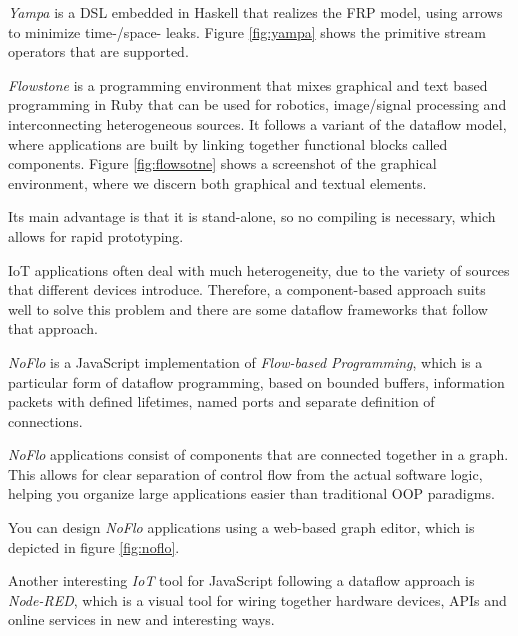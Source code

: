 \documentclass{dithesis}
\begin{document}
\textit{Yampa}\cite{yampa} is a DSL embedded in Haskell that realizes the FRP model, using arrows to minimize time-/space- leaks. Figure \ref{fig:yampa} shows the primitive stream operators that are supported. 



\textit{Flowstone}\cite{flowstone}  is a programming environment that mixes graphical and text based programming in Ruby that can be used for robotics, image/signal processing and interconnecting heterogeneous sources. It follows a variant of the dataflow model, where applications are built by linking together functional blocks called components. Figure \ref{fig:flowsotne} shows a screenshot of the graphical environment, where we discern both graphical and textual elements.


Its main advantage is that it is stand-alone, so no compiling is necessary, which allows for rapid prototyping.


IoT applications often deal with much heterogeneity, due to the variety of sources that different devices introduce. Therefore, a component-based approach suits well to solve this problem and there are some dataflow frameworks that follow that approach.


\textit{NoFlo}\cite{noflo} is a JavaScript implementation of \textit{Flow-based Programming}\cite{fbp}, which is a particular form of dataflow programming, based on bounded buffers, information packets with defined lifetimes, named ports and separate definition of connections.

\textit{NoFlo} applications consist of components that are connected together in a graph. This allows for clear separation of control flow from the actual software logic, helping you organize large applications easier than traditional OOP paradigms. 

You can design \textit{NoFlo} applications using a web-based graph editor, which is depicted in figure \ref{fig:noflo}.



Another interesting \textit{IoT} tool for JavaScript following a dataflow approach is \textit{Node-RED}\cite{node-red}, which is a visual tool for wiring together hardware devices, APIs and online services in new and interesting ways. 
\end{document}
